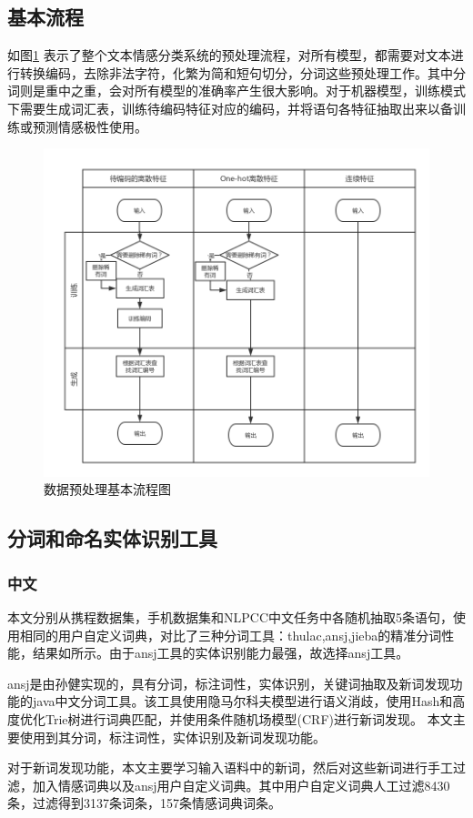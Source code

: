 \subsection{基本流程}
如图\ref{preprocessing} 表示了整个文本情感分类系统的预处理流程，对所有模型，都需要对文本进行转换编码，去除非法字符，化繁为简和短句切分，分词这些预处理工作。其中分词则是重中之重，会对所有模型的准确率产生很大影响。对于机器模型，训练模式下需要生成词汇表，训练待编码特征对应的编码，并将语句各特征抽取出来以备训练或预测情感极性使用。
\begin{figure}[!hbp]
\begin{center}
\includegraphics[width=\textwidth]{graphic/prepocessing.png}
\caption{数据预处理基本流程图 \label{preprocessing}}
\end{center}
\end{figure}

\subsection{分词和命名实体识别工具}
\subsubsection{中文}
本文分别从携程数据集，手机数据集和NLPCC中文任务中各随机抽取5条语句，使用相同的用户自定义词典，对比了三种分词工具：thulac,ansj,jieba的精准分词性能，结果如所示。由于ansj工具的实体识别能力最强，故选择ansj工具。\par
ansj是由孙健实现的，具有分词，标注词性，实体识别，关键词抽取及新词发现功能的java中文分词工具。该工具使用隐马尔科夫模型进行语义消歧，使用Hash和高度优化Trie树进行词典匹配，并使用条件随机场模型(CRF)进行新词发现。\cite{ansjwiki} 本文主要使用到其分词，标注词性，实体识别及新词发现功能。\par
对于新词发现功能，本文主要学习输入语料中的新词，然后对这些新词进行手工过滤，加入情感词典以及ansj用户自定义词典。其中用户自定义词典人工过滤8430条，过滤得到3137条词条，157条情感词典词条。
